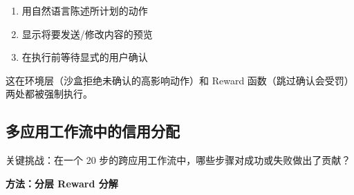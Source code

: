 \begin{keybox}[生产力副驾安全框架]
\begin{enumerate}
  \item 用自然语言陈述所计划的动作
  \item 显示将要发送/修改内容的预览
  \item 在执行前等待显式的用户确认
\end{enumerate}

这在环境层（沙盒拒绝未确认的高影响动作）和 Reward 函数（跳过确认会受罚）两处都被强制执行。
\end{keybox}

\subsection{多应用工作流中的信用分配}
\label{credit-assignment-in-multi-app-workflows}

关键挑战：在一个 20 步的跨应用工作流中，哪些步骤对成功或失败做出了贡献？

\textbf{方法：分层 Reward 分解}

